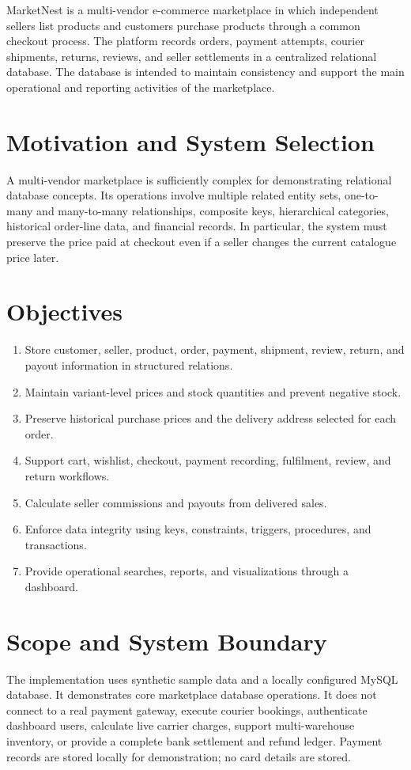 \documentclass[11pt,a4paper,oneside]{report}
\begin{document}
MarketNest is a multi-vendor e-commerce marketplace in which independent sellers list products and customers purchase products through a common checkout process. The platform records orders, payment attempts, courier shipments, returns, reviews, and seller settlements in a centralized relational database. The database is intended to maintain consistency and support the main operational and reporting activities of the marketplace.

\section{Motivation and System Selection}
A multi-vendor marketplace is sufficiently complex for demonstrating relational database concepts. Its operations involve multiple related entity sets, one-to-many and many-to-many relationships, composite keys, hierarchical categories, historical order-line data, and financial records. In particular, the system must preserve the price paid at checkout even if a seller changes the current catalogue price later.

\section{Objectives}
\begin{enumerate}
 \item Store customer, seller, product, order, payment, shipment, review, return, and payout information in structured relations.
 \item Maintain variant-level prices and stock quantities and prevent negative stock.
 \item Preserve historical purchase prices and the delivery address selected for each order.
 \item Support cart, wishlist, checkout, payment recording, fulfilment, review, and return workflows.
 \item Calculate seller commissions and payouts from delivered sales.
 \item Enforce data integrity using keys, constraints, triggers, procedures, and transactions.
 \item Provide operational searches, reports, and visualizations through a dashboard.
\end{enumerate}

\section{Scope and System Boundary}
The implementation uses synthetic sample data and a locally configured MySQL database. It demonstrates core marketplace database operations. It does not connect to a real payment gateway, execute courier bookings, authenticate dashboard users, calculate live carrier charges, support multi-warehouse inventory, or provide a complete bank settlement and refund ledger. Payment records are stored locally for demonstration; no card details are stored.
\end{document}
